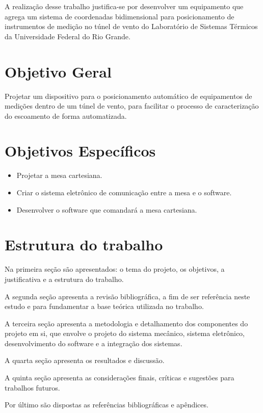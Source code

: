 A realização desse trabalho justifica-se por desenvolver um equipamento que agrega um sistema de coordenadas 
bidimensional para posicionamento de instrumentos de medição no túnel de vento do Laboratório de Sistemas Térmicos  
da Universidade Federal do Rio Grande.

\section{Objetivo Geral}\label{sec:objetivogeral}

Projetar um dispositivo para o posicionamento automático de equipamentos de medições dentro de um túnel de vento, 
para facilitar o processo de caracterização do escoamento de forma automatizada.

\section{Objetivos Específicos}\label{sec:objetivoesp}

	\begin{itemize}
		\item Projetar a mesa cartesiana.
		\item Criar o sistema eletrônico de comunicação entre a mesa e o software.
		\item Desenvolver o software que comandará a mesa cartesiana.
	\end{itemize}

\section{Estrutura do trabalho}\label{sec:estruturatrab}

Na primeira seção são apresentados: o tema do projeto, os objetivos, 
a justificativa e a estrutura do trabalho.

A segunda seção apresenta a revisão bibliográfica, a fim de ser referência neste estudo e para fundamentar 
a base teórica utilizada no trabalho.

A terceira seção apresenta a metodologia e detalhamento dos componentes do projeto em si, 
que envolve o projeto do sistema mecânico, sistema eletrônico, desenvolvimento do software 
e a integração dos sistemas.

A quarta seção apresenta os resultados e discussão.

A quinta seção apresenta as considerações finais, críticas e sugestões para trabalhos futuros.

Por último são dispostas as referências bibliográficas e apêndices.